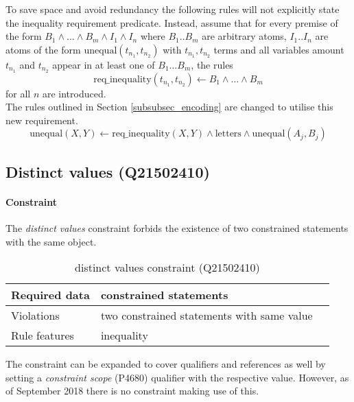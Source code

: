 \documentclass[hyperref,bachelorofscience,fleqn]{cgvpub}
\begin{document}
To save space and avoid redundancy the following rules will not explicitly state the inequality requirement predicate. Instead, assume that for every premise of the form \(B_1 \wedge \ldots\wedge B_m \wedge I_1 \wedge I_n\) where \(B_1 .. B_m\) are arbitrary atoms, \(I_1 .. I_n\) are atoms of the form \(\text{unequal}(t_{n_1}, t_{n_2})\) with \(t_{n_1}, t_{n_2}\) terms and all variables amount \(t_{n_1}\) and \(t_{n_2}\) appear in at least one of \(B_1 \ldots B_m\), the rules 
\begin{equation*}
\text{req\_inequality}(t_{n_1}, t_{n_2})
 \leftarrow B_1 \wedge \ldots \wedge B_m
\end{equation*} for all \(n\) are introduced.\\

The rules outlined in Section \ref{subsubsec_encoding} are changed to utilise this new requirement.
\begin{equation*}
\text{unequal}(X, Y) \leftarrow \text{req\_inequality}	(X, Y) \wedge \text{letters} \wedge \text{unequal}(A_j, B_j)
\end{equation*}

\subsection{Distinct values (Q21502410)}
\paragraph{Constraint}
The \emph{distinct values} constraint forbids the existence of two constrained statements with the same object.
\begin{table}[H]
\caption{distinct values constraint (Q21502410)}
\begin{tabularx}{\textwidth}{ ll X}
\hline
Required data & constrained statements \\
\hline
Violations & two constrained statements with same value \\
\hline
Rule features & inequality \\
\hline
\end{tabularx}
\end{table}
The constraint can be expanded to cover qualifiers and references as well by setting a \emph{constraint scope} (P4680) qualifier with the respective value. However, as of September 2018 there is no constraint making use of this.
\end{document}
